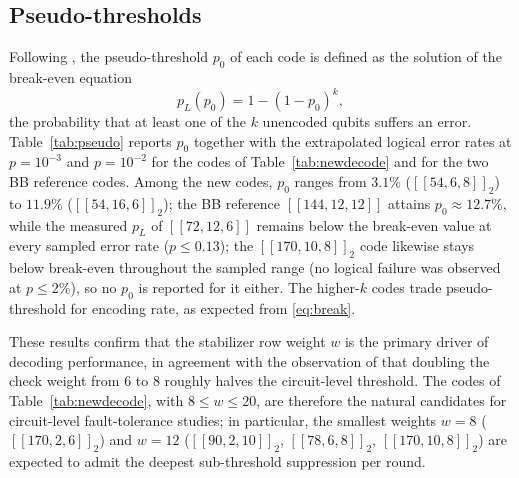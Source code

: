 \documentclass[journal,onecolumn]{IEEEtran}
\theoremstyle{definition}
\theoremstyle{remark}
\begin{document}
\subsection{Pseudo-thresholds}
Following \cite{BB24}, the pseudo-threshold $p_0$ of each code is defined
as the solution of the break-even equation
\begin{equation}\label{eq:break}
p_L(p_0)=1-(1-p_0)^{k},
\end{equation}
the probability that at least one of the $k$ unencoded qubits suffers an
error. Table~\ref{tab:pseudo} reports $p_0$ together with the
extrapolated logical error rates at $p=10^{-3}$ and $p=10^{-2}$ for the
codes of Table~\ref{tab:newdecode} and for the two BB reference codes.
Among the new codes, $p_0$ ranges from $3.1\%$ ($[[54,6,8]]_2$) to
$11.9\%$ ($[[54,16,6]]_2$); the BB reference $[[144,12,12]]$ attains
$p_0\approx 12.7\%$, while the measured $p_L$ of $[[72,12,6]]$ remains
below the break-even value at every sampled error rate ($p\le 0.13$); the
$[[170,10,8]]_2$ code likewise stays below break-even throughout the sampled
range (no logical failure was observed at $p\le2\%$), so no $p_0$ is
reported for it either.
The higher-$k$ codes trade pseudo-threshold for encoding rate, as
expected from \eqref{eq:break}.

These results confirm that the stabilizer row weight $w$ is the primary
driver of decoding performance, in agreement with the observation of
\cite{ATB} that doubling the check weight from $6$ to $8$ roughly halves
the circuit-level threshold. The codes of Table~\ref{tab:newdecode},
with $8\le w\le 20$, are therefore the natural candidates for
circuit-level fault-tolerance studies; in particular, the smallest
weights $w=8$ ($[[170,2,6]]_2$) and $w=12$
($[[90,2,10]]_2$, $[[78,6,8]]_2$, $[[170,10,8]]_2$) are expected to
admit the deepest sub-threshold suppression per round.
\end{document}
